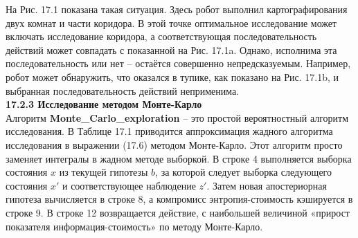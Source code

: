 \documentclass[10pt,a4paper]{article}
\begin{document}
На Рис. 17.1 показана такая ситуация. Здесь робот выполнил картографирования двух комнат и части коридора. В этой точке оптимальное исследование может включать исследование коридора, а соответствующая последовательность действий может совпадать с показанной на Рис. 17.1a. Однако, исполнима эта последовательность или нет – остаётся совершенно непредсказуемым. Например, робот может обнаружить, что оказался в тупике, как показано на Рис. 17.1b, и выбранная последовательность действий неприменима.\\

\textbf{17.2.3	Исследование методом Монте-Карло}\\

Алгоритм \textbf{Monte\_Carlo\_exploration} – это простой вероятностный алгоритм исследования. В Таблице 17.1 приводится аппроксимация жадного алгоритма исследования в выражении (17.6) методом Монте-Карло. Этот алгоритм просто заменяет интегралы в жадном методе выборкой. В строке 4  выполняется выборка состояния $x$ из текущей гипотезы $b$, за которой следует выборка следующего состояния $x'$ и соответствующее наблюдение $z'$. Затем новая апостериорная гипотеза вычисляется в строке 8, а компромисс энтропия-стоимость кэшируется в строке 9. В строке 12 возвращается действие, с наибольшей величиной «прирост показателя информация-стоимость» по методу Монте-Карло.
\end{document}
